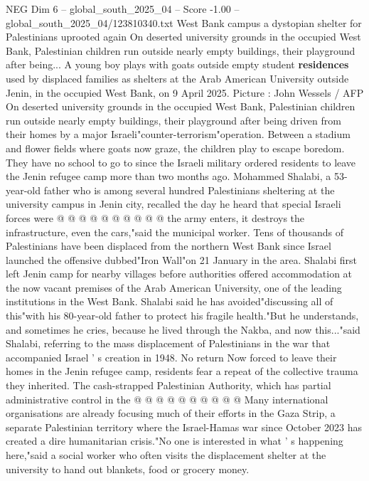 \begin{textsample}{NEG Dim 6 – global\_south\_2025\_04 – Score -1.00 – global\_south\_2025\_04/123810340.txt}  \label{ex:f6_neg_171}
West Bank campus a dystopian shelter for Palestinians uprooted again On deserted university grounds in the occupied West Bank, Palestinian children run outside nearly empty buildings, their playground after being...
A young boy plays with goats outside empty student \textbf{residences} used by displaced families as shelters at the Arab American University outside Jenin, in the occupied West Bank, on 9 April 2025.
Picture : John Wessels / AFP On deserted university grounds in the occupied West Bank, Palestinian children run outside nearly empty buildings, their playground after being driven from their homes by a major Israeli"counter-terrorism"operation.
Between a stadium and flower fields where goats now graze, the children play to escape boredom.
They have no school to go to since the Israeli military ordered residents to leave the Jenin refugee camp more than two months ago.
Mohammed Shalabi, a 53-year-old father who is among several hundred Palestinians sheltering at the university campus in Jenin city, recalled the day he heard that special Israeli forces were @ @ @ @ @ @ @ @ @ @ the army enters, it destroys the infrastructure, even the cars,"said the municipal worker.
Tens of thousands of Palestinians have been displaced from the northern West Bank since Israel launched the offensive dubbed"Iron Wall"on 21 January in the area.
Shalabi first left Jenin camp for nearby villages before authorities offered accommodation at the now vacant premises of the Arab American University, one of the leading institutions in the West Bank.
Shalabi said he has avoided"discussing all of this"with his 80-year-old father to protect his fragile health."But he understands, and sometimes he cries, because he lived through the Nakba, and now this..."said Shalabi, referring to the mass displacement of Palestinians in the war that accompanied Israel ' s creation in 1948.
No return Now forced to leave their homes in the Jenin refugee camp, residents fear a repeat of the collective trauma they inherited.
The cash-strapped Palestinian Authority, which has partial administrative control in the @ @ @ @ @ @ @ @ @ @ Many international organisations are already focusing much of their efforts in the Gaza Strip, a separate Palestinian territory where the Israel-Hamas war since October 2023 has created a dire humanitarian crisis."No one is interested in what ' s happening here,"said a social worker who often visits the displacement shelter at the university to hand out blankets, food or grocery money.

\end{textsample}
